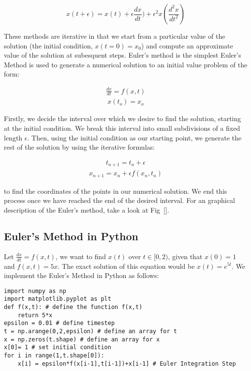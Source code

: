 \documentclass[10pt,letterpaper]{article}
\begin{document}
\begin{equation}
x(t+\epsilon) = x(t) + \epsilon\frac{dx}{dt})+\epsilon^2x(\frac{d^2x}{dt^2})
\end{equation}

These methods are iterative in that we start from a particular value of the solution (the initial condition, $x(t=0)=x_{0}$) and compute an approximate value of the solution at subesquent steps.
Euler's method is the simplest 
Euler's Method is used to generate a numerical solution to an initial value problem of the form:

\begin{eqnarray}\frac{dx}{dt} = f(x, t)\end{eqnarray}
\begin{eqnarray}x(t_o) = x_o\end{eqnarray}

Firstly, we decide the interval over which we desire to find the solution, starting at the initial condition. We break this interval into small subdivisions of a fixed length $\epsilon$. Then, using the initial condition as our starting point, we generate the rest of the solution by using the iterative formulas:

\begin{eqnarray} t_{n+1} = t_n + \epsilon \end{eqnarray}
\begin{eqnarray} x_{n+1} = x_n + \epsilon f(x_n, t_n) \end{eqnarray}

to find the coordinates of the points in our numerical solution. We end this process once we have reached the end of the desired interval. For an graphical description of the Euler's method, take a look at Fig~\ref{}.

\subsection*{Euler's Method in Python}

Let $\frac{dx}{dt}=f(x,t)$, we want to find $x(t)$ over $t\in[0,2)$, given that $x(0)=1$ and $f(x,t) = 5x$. The exact solution of this equation would be $x(t) = e^{5t}$. We implement the Euler's Method in Python as follows:

\begin{verbatim}
import numpy as np
import matplotlib.pyplot as plt
def f(x,t): # define the function f(x,t)
    return 5*x
epsilon = 0.01 # define timestep
t = np.arange(0,2,epsilon) # define an array for t
x = np.zeros(t.shape) # define an array for x
x[0]= 1 # set initial condition
for i in range(1,t.shape[0]):
    x[i] = epsilon*f(x[i-1],t[i-1])+x[i-1] # Euler Integration Step
\end{verbatim}
\end{document}
